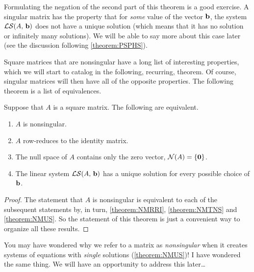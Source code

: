 \documentclass{ximera}
\begin{document}
Formulating the negation of the second part of this theorem is a good
exercise.  A singular matrix has the property that for \textit{some}
value of the vector $\mathbf{b}$, the system
$\mathcal{LS}\!\left(A,\,\mathbf{b}\right)$ does not have a unique solution (which
means that it has no solution or infinitely many solutions).  We will
be able to say more about this case later (see the discussion
following \ref{theorem:PSPHS}).

Square matrices that are nonsingular have a long list of interesting
properties, which we will start to catalog in the following,
recurring, theorem.  Of course, singular matrices will then have all
of the opposite properties.  The following theorem is a list of
equivalences.

\begin{theorem}
  Suppose that $A$ is a square matrix.  The following are equivalent.
  \begin{enumerate}
  \item $A$ is nonsingular.
  \item $A$ row-reduces to the identity matrix.
  \item The null space of $A$ contains only the zero vector, $\mathcal{N}\!\left(A\right)=\left\{\mathbf{0}\right\}$.
  \item The linear system $\mathcal{LS}\!\left(A,\,\mathbf{b}\right)$ has a unique solution for every possible choice of $\mathbf{b}$.
  \end{enumerate}
  
  \begin{proof}
    The statement that $A$ is nonsingular is equivalent to each of the
    subsequent statements by, in turn, \ref{theorem:NMRRI},
    \ref{theorem:NMTNS} and \ref{theorem:NMUS}.  So the statement of
    this theorem is just a convenient way to organize all these
    results.
  \end{proof}
\end{theorem}

\begin{warning}
  You may have wondered why we refer to a matrix as
  \textit{nonsingular} when it creates systems of equations with
  \textit{single} solutions (\ref{theorem:NMUS})!  I have wondered the
  same thing.  We will have an opportunity to address this later\ldots
\end{warning}
\end{document}
